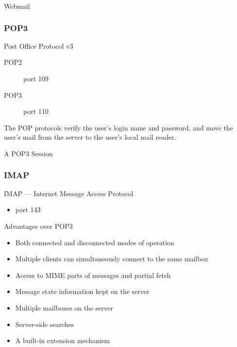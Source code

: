 \begin{frame}{Webmail}
  \begin{center}
  \end{center}
  \label{fig:smtp-pop3}
\end{frame}

\subsubsection{POP3}

\begin{frame}{Post Office Protocol v3}
  \begin{minipage}{.7\linewidth}
    \begin{description}
    \item[POP2] port 109
    \item[POP3] port 110
    \end{description}
    The POP protocols verify the user's login name and password, and move the user's mail
    from the server to the user's local mail reader.
  \end{minipage}\hfill
  \begin{minipage}{.25\linewidth}
    \begin{iblock}{A POP3 Session}
      \centering
      \mode<beamer>{ \texttt{[image: pop3\_session]} }%
      \label{fig:pop3_session}
    \end{iblock}
  \end{minipage}
\end{frame}
  
\subsubsection{IMAP}

\begin{frame}{IMAP --- Internet Message Access Protocol}
  \begin{itemize}
  \item port 143
  \end{itemize}
  \begin{iblock}{Advantages over POP3}
    \begin{itemize}
    \item Both connected and disconnected modes of operation
    \item Multiple clients can simultaneously connect to the same mailbox
    \item Access to MIME parts of messages and partial fetch
    \item Message state information kept on the server
    \item Multiple mailboxes on the server
    \item Server-side searches
    \item A built-in extension mechanism
    \end{itemize}
  \end{iblock}
\end{frame}

